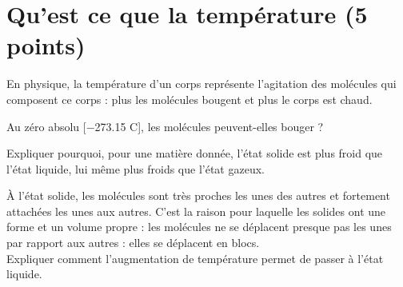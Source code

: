 \section{Qu'est ce que la température (5 points) }\label{ex:temperture}

En physique, la température d'un corps représente l'agitation des molécules qui composent ce corps : plus les molécules bougent et plus le corps est chaud.

\begin{questions}
	\question[1] Au zéro absolu [\num{-273.15} \degree C], les molécules peuvent-elles bouger ?
	
	\question[2] Expliquer pourquoi, pour une matière donnée, l'état solide est plus froid que l'état liquide, lui même plus froids que l'état gazeux.
	
	\question[2] À l'état solide, les molécules sont très proches les unes des autres et fortement attachées les unes aux autres. C'est la raison pour laquelle les solides ont une forme et un volume propre : les molécules ne se déplacent presque pas les unes par rapport aux autres : elles se déplacent en blocs. \\ Expliquer comment l'augmentation de température permet de passer à l'état liquide.
\end{questions}